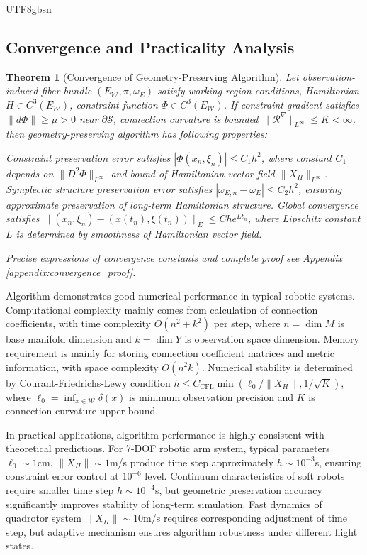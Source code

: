 \documentclass[a4paper,12pt]{extarticle}
\newtheorem{theorem}{Theorem}
\theoremstyle{definition}
\begin{document}
\begin{CJK}{UTF8}{gbsn}
\subsection{Convergence and Practicality Analysis}
\label{subsec:convergence_analysis}

\begin{theorem}[Convergence of Geometry-Preserving Algorithm]
\label{thm:convergence}
Let observation-induced fiber bundle $(E_{\mathcal{W}}, \pi, \omega_E)$ satisfy working region conditions, Hamiltonian $H \in C^3(E_{\mathcal{W}})$, constraint function $\Phi \in C^3(E_{\mathcal{W}})$. If constraint gradient satisfies $\|d\Phi\| \geq \mu > 0$ near $\partial\mathcal{S}$, connection curvature is bounded $\|\mathcal{R}^\nabla\|_{L^\infty} \leq K < \infty$, then geometry-preserving algorithm has following properties:

Constraint preservation error satisfies $|\Phi(x_n, \xi_n)| \leq C_1 h^2$, where constant $C_1$ depends on $\|D^2\Phi\|_{L^\infty}$ and bound of Hamiltonian vector field $\|X_H\|_{L^\infty}$. Symplectic structure preservation error satisfies $|\omega_{E,n} - \omega_E| \leq C_2 h^2$, ensuring approximate preservation of long-term Hamiltonian structure. Global convergence satisfies $\|(x_n, \xi_n) - (x(t_n), \xi(t_n))\|_E \leq C h e^{Lt_n}$, where Lipschitz constant $L$ is determined by smoothness of Hamiltonian vector field.

Precise expressions of convergence constants and complete proof see Appendix \ref{appendix:convergence_proof}.
\end{theorem}

Algorithm demonstrates good numerical performance in typical robotic systems. Computational complexity mainly comes from calculation of connection coefficients, with time complexity $O(n^2 + k^2)$ per step, where $n = \dim M$ is base manifold dimension and $k = \dim Y$ is observation space dimension. Memory requirement is mainly for storing connection coefficient matrices and metric information, with space complexity $O(n^2k)$. Numerical stability is determined by Courant-Friedrichs-Lewy condition $h \leq C_{\text{CFL}} \min(\ell_0/\|X_H\|, 1/\sqrt{K})$, where $\ell_0 = \inf_{x \in \mathcal{W}} \delta(x)$ is minimum observation precision and $K$ is connection curvature upper bound.

In practical applications, algorithm performance is highly consistent with theoretical predictions. For 7-DOF robotic arm system, typical parameters $\ell_0 \sim 1$cm, $\|X_H\| \sim 1$m/s produce time step approximately $h \sim 10^{-3}$s, ensuring constraint error control at $10^{-6}$ level. Continuum characteristics of soft robots require smaller time step $h \sim 10^{-4}$s, but geometric preservation accuracy significantly improves stability of long-term simulation. Fast dynamics of quadrotor system $\|X_H\| \sim 10$m/s requires corresponding adjustment of time step, but adaptive mechanism ensures algorithm robustness under different flight states.


\end{CJK}
\end{document}
